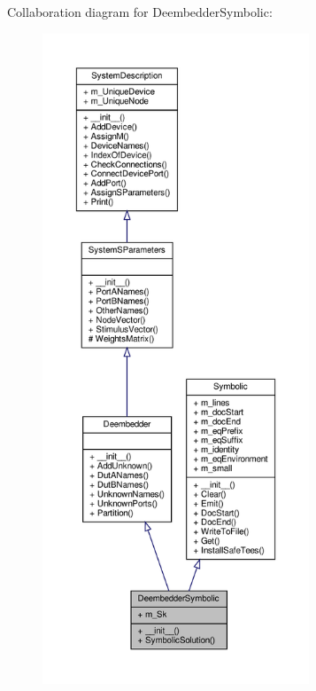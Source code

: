 Collaboration diagram for Deembedder\+Symbolic\+:\nopagebreak
\begin{figure}[H]
\begin{center}
\leavevmode
\includegraphics[height=550pt]{classSignalIntegrity_1_1SystemDescriptions_1_1DeembedderSymbolic_1_1DeembedderSymbolic__coll__graph}
\end{center}
\end{figure}
